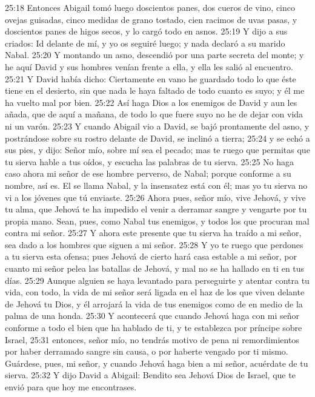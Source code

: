 25:18 Entonces Abigail tomó luego doscientos panes, dos cueros de vino, cinco ovejas guisadas, cinco medidas   de grano tostado, cien racimos de uvas pasas, y doscientos panes de higos secos, y lo cargó todo en asnos.  
25:19 Y dijo a sus criados: Id delante de mí, y yo os seguiré luego; y nada declaró a su marido Nabal.  
25:20 Y montando un asno, descendió por una parte secreta del monte; y he aquí David y sus hombres venían frente a ella, y ella les salió al encuentro.  
25:21 Y David había dicho: Ciertamente en vano he guardado todo lo que éste tiene en el desierto, sin que nada le haya faltado de todo cuanto es suyo; y él me ha vuelto mal por bien.  
25:22 Así haga Dios a los enemigos de David y aun les añada, que de aquí a mañana, de todo lo que fuere suyo no he de dejar con vida ni un varón.  
25:23 Y cuando Abigail vio a David, se bajó prontamente del asno, y postrándose sobre su rostro delante de David, se inclinó a tierra;  
25:24 y se echó a sus pies, y dijo: Señor mío, sobre mí sea el pecado; mas te ruego que permitas que tu sierva hable a tus oídos, y escucha las palabras de tu sierva.  
25:25 No haga caso ahora mi señor de ese hombre perverso, de Nabal; porque conforme a su nombre, así es. El se llama Nabal, y la insensatez está con él; mas yo tu sierva no vi a los jóvenes que tú enviaste.  
25:26 Ahora pues, señor mío, vive Jehová, y vive tu alma, que Jehová te ha impedido el venir a derramar sangre y vengarte por tu propia mano. Sean, pues, como Nabal tus enemigos, y todos los que procuran mal contra mi señor.  
25:27 Y ahora este presente que tu sierva ha traído a mi señor, sea dado a los hombres que siguen a mi señor.  
25:28 Y yo te ruego que perdones a tu sierva esta ofensa; pues Jehová de cierto hará casa estable a mi señor, por cuanto mi señor pelea las batallas de Jehová, y mal no se ha hallado en ti en tus días.  
25:29 Aunque alguien se haya levantado para perseguirte y atentar contra tu vida, con todo, la vida de mi señor será ligada en el haz de los que viven delante de Jehová tu Dios, y él arrojará la vida de tus enemigos como de en medio de la palma de una honda.  
25:30 Y acontecerá que cuando Jehová haga con mi señor conforme a todo el bien que ha hablado de ti, y te establezca por príncipe sobre Israel,  
25:31 entonces, señor mío, no tendrás motivo de pena ni remordimientos por haber derramado sangre sin causa, o por haberte vengado por ti mismo. Guárdese, pues, mi señor, y cuando Jehová haga bien a mi señor, acuérdate de tu sierva.  
25:32 Y dijo David a Abigail: Bendito sea Jehová Dios de Israel, que te envió para que hoy me encontrases.  
